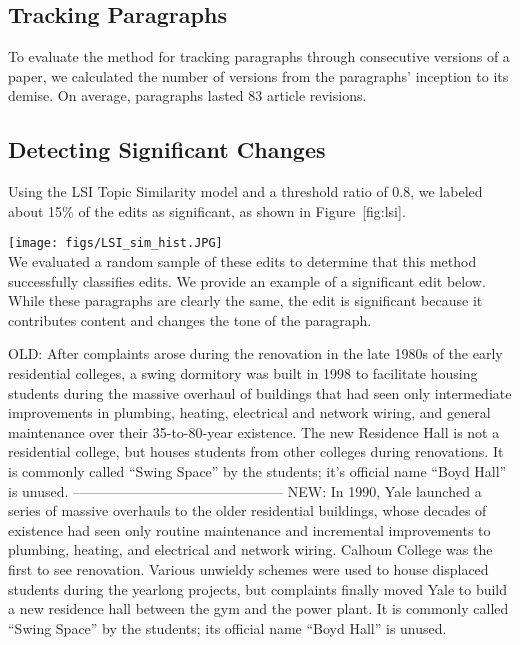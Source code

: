 \subsection{Tracking Paragraphs}\label{tracking-paragraphs-1}

To evaluate the method for tracking paragraphs through consecutive
versions of a paper, we calculated the number of versions from the
paragraphs' inception to its demise. On average, paragraphs lasted 83
article revisions.

\subsection{Detecting Significant
Changes}\label{detecting-significant-changes}

Using the LSI Topic Similarity model and a threshold ratio of 0.8, we
labeled about 15\% of the edits as significant, as shown in
Figure~{[}fig:lsi{]}.

\texttt{[image: figs/LSI\_sim\_hist.JPG]}\\

We evaluated a random sample of these edits to determine that this
method successfully classifies edits. We provide an example of a
significant edit below. While these paragraphs are clearly the same, the
edit is significant because it contributes content and changes the tone
of the paragraph.

OLD: After complaints arose during the renovation in the late 1980s of
the early residential colleges, a swing dormitory was built in 1998 to
facilitate housing students during the massive overhaul of buildings
that had seen only intermediate improvements in plumbing, heating,
electrical and network wiring, and general maintenance over their
35-to-80-year existence. The new Residence Hall is not a residential
college, but houses students from other colleges during renovations. It
is commonly called ``Swing Space'' by the students; it's official name
``Boyd Hall'' is unused. ---------------------------------------------
NEW: In 1990, Yale launched a series of massive overhauls to the older
residential buildings, whose decades of existence had seen only routine
maintenance and incremental improvements to plumbing, heating, and
electrical and network wiring. Calhoun College was the first to see
renovation. Various unwieldy schemes were used to house displaced
students during the yearlong projects, but complaints finally moved Yale
to build a new residence hall between the gym and the power plant. It is
commonly called ``Swing Space'' by the students; its official name
``Boyd Hall'' is unused.

